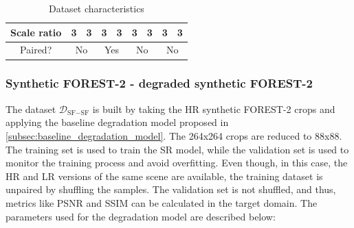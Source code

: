 \begin{table}[H]
{\begin{tabular}{|c|cccc|cccc|}
    Scale ratio & 3                                                            & \multicolumn{1}{c|}{3}                                                                     & 3                                                            & 3                                                                     & 3                                                            & \multicolumn{1}{c|}{3}                                                        & 3                                                            & 3                                                        \\ \hline
    Paired?     & \multicolumn{2}{c|}{No}                                                                                                                                   & \multicolumn{2}{c|}{Yes}                                                                                                             & \multicolumn{2}{c|}{No}                                                                                                                      & \multicolumn{2}{c|}{No}                                                                                                 \\ \hline
    \end{tabular}%
    }
    \caption{Dataset characteristics}
    \label{tab:dataset_characteristics}
    \end{table}


\subsubsection{Synthetic FOREST-2 - degraded synthetic FOREST-2}
    The dataset $\mathcal{D}_{\text{SF}-\text{SF}}$ is built by taking the HR synthetic FOREST-2 crops and applying the baseline degradation model proposed in \ref{subsec:baseline_degradation_model}. 
    The 264x264 crops are reduced to 88x88. The training set is used to train the SR model, while the validation set is used to monitor the training process and avoid overfitting. 
    Even though, in this case, the HR and LR versions of the same scene are available, the training dataset is unpaired by shuffling the samples.
    The validation set is not shuffled, and thus, metrics like PSNR and SSIM can be calculated in the target domain. The parameters used for the degradation model are described below:

